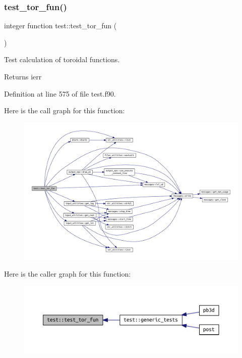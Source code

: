 \subsubsection{\texorpdfstring{test\+\_\+tor\+\_\+fun()}{test\_tor\_fun()}}
{\footnotesize\ttfamily integer function test\+::test\+\_\+tor\+\_\+fun (\begin{DoxyParamCaption}{ }\end{DoxyParamCaption})}



Test calculation of toroidal functions. 

\begin{DoxyReturn}{Returns}
ierr 
\end{DoxyReturn}


Definition at line 575 of file test.\+f90.

Here is the call graph for this function\+:\nopagebreak
\begin{figure}[H]
\begin{center}
\leavevmode
\includegraphics[width=350pt]{namespacetest_ab595ec935321ea0b1168593fb88fad22_cgraph}
\end{center}
\end{figure}
Here is the caller graph for this function\+:\nopagebreak
\begin{figure}[H]
\begin{center}
\leavevmode
\includegraphics[width=350pt]{namespacetest_ab595ec935321ea0b1168593fb88fad22_icgraph}
\end{center}
\end{figure}

